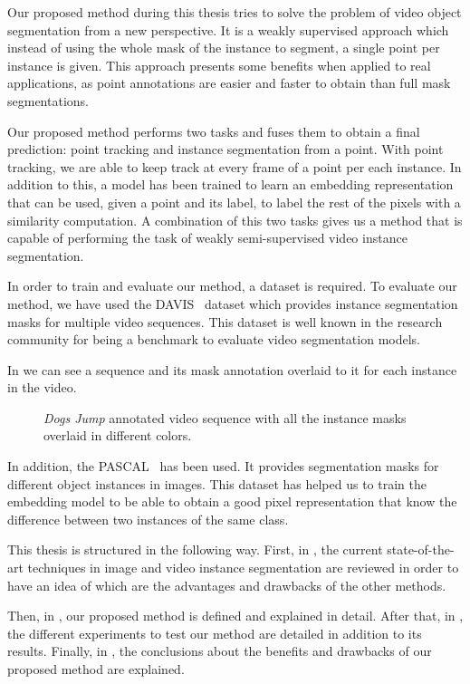 Our proposed method during this thesis tries to solve the problem of video object segmentation from a new perspective.
It is a weakly supervised approach which instead of using the whole mask of the instance to segment, a single point per instance is given.
This approach presents some benefits when applied to real applications, as point annotations are easier and faster to obtain than full mask segmentations.


Our proposed method performs two tasks and fuses them to obtain a final prediction: point tracking and instance segmentation from a point.
With point tracking, we are able to keep track at every frame of a point per each instance.
In addition to this, a model has been trained to learn an embedding representation that can be used, given a point and its label, to label the rest of the pixels with a similarity computation.
A combination of this two tasks gives us a method that is capable of performing the task of weakly semi-supervised video instance segmentation.

In order to train and evaluate our method, a dataset is required.
To evaluate our method, we have used the DAVIS~\davisboth{} dataset which provides instance segmentation masks for multiple video sequences.
This dataset is well known in the research community for being a benchmark to evaluate video segmentation models.

In  we can see a sequence and its mask annotation overlaid to it for each instance in the video.

\begin{figure}[h]
  \centering
  \caption{\textit{Dogs Jump} annotated video sequence with all the instance masks overlaid in different colors. }
  \label{fig:intro:davis}
\end{figure}

In addition, the PASCAL~\pascal{} has been used.
It provides segmentation masks for different object instances in images.
This dataset has helped us to train the embedding model to be able to obtain a good pixel representation that know the difference between two instances of the same class.

This thesis is structured in the following way. First, in , the current state-of-the-art techniques in image and video instance segmentation are reviewed in order to have an idea of which are the advantages and drawbacks of the other methods.

Then, in , our proposed method is defined and explained in detail.
After that, in , the different experiments to test our method are detailed in addition to its results.
Finally, in , the conclusions about the benefits and drawbacks of our proposed method are explained.
